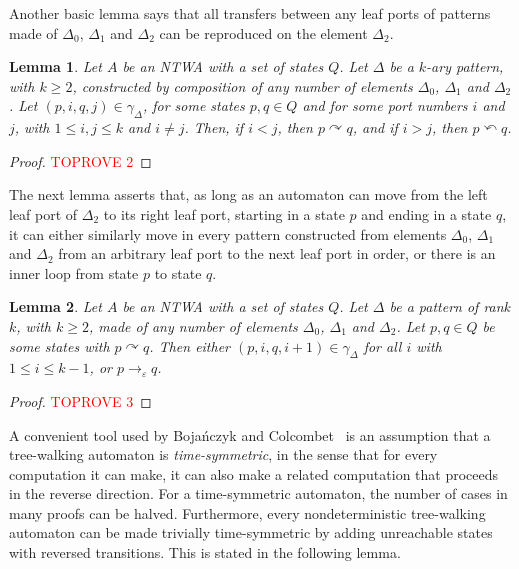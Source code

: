 \documentclass[12pt,a4paper]{article}
\newtheorem{lemma}{Lemma}
\theoremstyle{definition}
\renewcommand{\epsilon}{\varepsilon}
\begin{document}
Another basic lemma
says that all transfers between any leaf ports of patterns
made of $\Delta_0$, $\Delta_1$ and $\Delta_2$
can be reproduced on the element $\Delta_2$.

\begin{lemma}\label{lemma_from_big_elements_to_Delta_2}
Let $A$ be an NTWA with a set of states $Q$.
Let $\Delta$ be a $k$-ary pattern, with $k \geqslant 2$, 
constructed by composition of any number of elements $\Delta_0$, $\Delta_1$ and $\Delta_2$.
Let $(p,i,q,j) \in \gamma_\Delta$, for some states $p,q \in Q$ and
for some port numbers $i$ and $j$, with $1 \leqslant i,j \leqslant k$ and $i \neq j$.
Then, if $i < j$, then $p \curvearrowright q$,
and if $i > j$, then $p \curvearrowleft q$.
\end{lemma}
\begin{proof}\textcolor{red}{TOPROVE 2}\end{proof}

The next lemma asserts that,
as long as an automaton can move from the left leaf port of $\Delta_2$
to its right leaf port,
starting in a state $p$ and ending in a state $q$,
it can either similarly move
in every pattern constructed from elements $\Delta_0$, $\Delta_1$ and $\Delta_2$
from an arbitrary leaf port to the next leaf port in order,
or there is an inner loop from state $p$ to state $q$.

\begin{lemma}\label{lemma_transfers_through_Delta2_in_big_elements}
Let $A$ be an NTWA with a set of states $Q$.
Let $\Delta$ be a pattern of rank $k$, with $k \geqslant 2$, 
made of any number of elements $\Delta_0$, $\Delta_1$ and $\Delta_2$.
Let $p,q \in Q$ be some states with $p \curvearrowright q$.
Then either $(p,i,q,i+1)\in \gamma_\Delta$ for all $i$ with $1 \leqslant i \leqslant k-1$,
or $p \to_\epsilon q$.
\end{lemma}
\begin{proof}\textcolor{red}{TOPROVE 3}\end{proof}

A convenient tool used by Boja\'nczyk and Colcombet~\cite[Sect.~2.1]{BojanczykColcombet_reg}
is an assumption that
a tree-walking automaton is \emph{time-symmetric},
in the sense that for every computation it can make,
it can also make a related computation
that proceeds in the reverse direction.
For a time-symmetric automaton, the number of cases in many proofs can be halved.
Furthermore, every nondeterministic tree-walking automaton can be made trivially time-symmetric
by adding unreachable states with reversed transitions.
This is stated in the following lemma.
\end{document}
